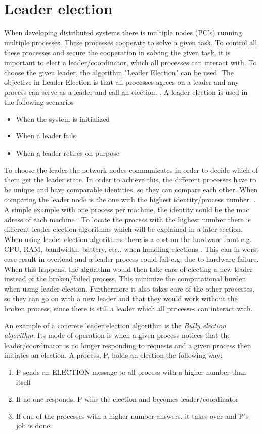 \documentclass[Main]{subfiles}
\begin{document}
\section{Leader election}
When developing distributed systems there is multiple nodes (PC's) running multiple processes. These processes cooperate to solve a given task. To control all these processes and secure the cooperation in solving the given task, it is important to elect a leader/coordinator, which all processes can interact with\cite{EAlgInDS}. To choose the given leader, the algorithm "Leader Election" can be used.  The objective in Leader Election is that all processes agrees on a leader and any process can serve as a leader and call an election. \cite{RMI-slides}. A leader election is used in the following scenarios
\begin{itemize}
\item When the system is initialized
\item When a leader fails
\item When a leader retires on purpose
\end{itemize}
To choose the leader the network nodes communicates in order to decide which of them get the leader state. In order to achieve this, the different processes have to be unique and have comparable identities, so they can compare  each other. When comparing the leader node is the one with the highest identity/process number. \cite{wiki-Leader}. A simple example with one process per machine, the identity could be the mac adress of each machine \cite{ElectionAlgorithm}.
To locate the process with the highest number there is different leader election algorithms which will be explained in a later section.\\

When using leader election algorithms there is a cost on the hardware front e.g. CPU, RAM, bandwidth, battery, etc., when handling elections \cite{RMI-slides}. This can in worst case result in overload and a leader process could fail e.g. due to hardware failure. When this happens, the algorithm would then take care of electing a new leader instead of the broken/failed process. This minimize the computational burden when using leader election. Furthermore it also takes care of the other processes, so they can go on with a new leader and that they would work without the broken process, since there is still a leader which all processes can interact with.\cite{EAlgInDS}

An example of a concrete leader election algorithm is the \textit{Bully election algorithm}. Its mode of operation is when a given process notices that the leader/coordinator is no longer responding to requests and a given process then initiates an election. A process, P,  holds an election the following way:
\begin{enumerate}
\item P sends an ELECTION message to all process with a higher number than itself
\item If no one responds, P wins the election and becomes leader/coordinator
\item If one of the processes with a higher number answers, it takes over and P's job is done 
\end{enumerate}
\end{document}
